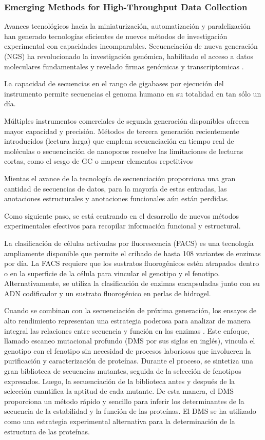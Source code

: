 \documentclass[12pt]{article}
\begin{document}
\subsubsection{Emerging Methods for High-Throughput Data
Collection}

Avances tecnológicos hacia la miniaturización, automatización y paralelización han generado tecnologías eficientes de nuevos métodos de investigación experimental con capacidades incomparables. Secuenciación de nueva generación (NGS) ha revolucionado la investigación genómica, habilitado el acceso a datos moleculares fundamentales y revelado firmas genómicas  y transcriptomicas \cite{47,48}.

La capacidad de secuencias en el rango de gigabases por ejecución del instrumento permite secuencias el genoma humano en su totalidad en tan sólo un día. 

Múltiples instrumentos comerciales de segunda generación disponibles ofrecen mayor capacidad y precisión. Métodos de tercera generación recientemente introducidos (lectura larga)  que emplean secuenciación en tiempo real de moléculas \cite{50} o secuenciación de nanoporos \cite{51} resuelve las limitaciones de lecturas cortas, como el sesgo de GC o mapear elementos repetitivos

Mientas el avance de la tecnología de secuenciación proporciona una gran cantidad de secuencias de datos, para la mayoría de estas entradas, las anotaciones estructurales y anotaciones funcionales aún están perdidas. 


Como siguiente paso, se está centrando en el desarrollo de nuevos métodos experimentales efectivos para recopilar información funcional y estructural. 

La clasificación de células activadas por fluorescencia (FACS) es una tecnología ampliamente disponible que permite el cribado de hasta 108 variantes de enzimas por día. La FACS requiere que los sustratos fluorogénicos estén atrapados dentro o en la superficie de la célula para vincular el genotipo y el fenotipo. Alternativamente, se utiliza la clasificación de enzimas encapsuladas junto con su ADN codificador y un sustrato fluorogénico en perlas de hidrogel.

Cuando se combinan con la secuenciación de próxima generación, los ensayos de alto rendimiento representan una estrategia poderosa para analizar de manera integral las relaciones entre secuencia y función en las enzimas \cite{52,55}. Este enfoque, llamado escaneo mutacional profundo (DMS por sus siglas en inglés), vincula el genotipo con el fenotipo sin necesidad de procesos laboriosos que involucren la purificación y caracterización de proteínas. Durante el proceso, se sintetiza una gran biblioteca de secuencias mutantes, seguida de la selección de fenotipos expresados. Luego, la secuenciación de la biblioteca antes y después de la selección cuantifica la aptitud de cada mutante. De esta manera, el DMS proporciona un método rápido y sencillo para inferir los determinantes de la secuencia de la estabilidad y la función de las proteínas\cite{52,56,57}. El DMS se ha utilizado como una estrategia experimental alternativa para la determinación de la estructura de las proteínas.
\end{document}
